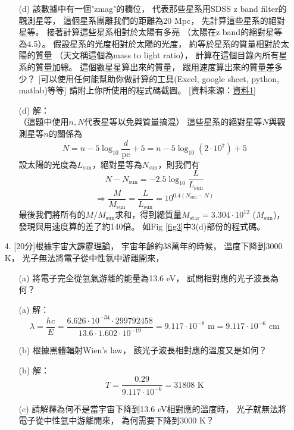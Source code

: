\documentclass{article}
\theoremstyle{definition}
\begin{document}
\begin{enumerate}
\begin{enumerate}
			\item[(d)] 該數據中有一個"zmag"的欄位，
				代表那些星系用SDSS z band filter的觀測星等，
				這個星系團離我們的距離為20 Mpc，
				先計算這些星系的絕對星等。
				接著計算這些星系相對於太陽有多亮
				（太陽在z band的絕對星等為4.5）。
				假設星系的光度相對於太陽的光度，
				約等於星系的質量相對於太陽的質量
				（天文稱這個為mass to light ratio），
				計算在這個目錄內所有星系的質量加總。
				這個數星星算出來的質量，
				跟用速度算出來的質量差多少？
				[可以使用任何能幫助你做計算的工具(Excel, google sheet, python, matlab)等等]
				請附上你所使用的程式碼截圖。
				[資料來源：\href{https://ui.adsabs.harvard.edu/abs/2015yCat..22150022K/abstract}{資料1}]

			\item[(d)] 解：\\
				（這題中使用$n, N$代表星等以免與質量搞混）
				這些星系的絕對星等$N$與觀測星等$n$的關係為
				\[
					N = n - 5 \log_{10} \frac{d}{\text{pc}} + 5 = n - 5 \log_{10} (2 \cdot 10^7) + 5
				\]
				設太陽的光度為$L_{\text{sun}}$，絕對星等為$N_{\text{sun}}$，則我們有
				\[
					N - N_{\text{sun}} = -2.5 \log_{10} \frac{L}{L_{\text{sun}}}
				\]
				\[
					\Rightarrow \frac{M}{M_{\text{sun}}} = \frac{L}{L_{\text{sun}}} = 10^{0.4 (N_{\text{sun}} - N)}
				\]
				最後我們將所有的$M/M_{\text{sun}}$求和，得到總質量$M_{\text{star}} = 3.304 \cdot 10^{12}$ ($M_{\text{sun}}$)，
				發現與用速度算的差了約140倍。
				如Fig \ref{fig3}中3(d)部份的程式碼。
		\end{enumerate}

	\item[4.] [20分]根據宇宙大霹靂理論，
		宇宙年齡約38萬年的時候，
		溫度下降到3000 K，
		光子無法將電子從中性氫中游離開來，
		
		\begin{enumerate}
			\item[(a)] 將電子完全從氫氣游離的能量為13.6 eV，
				試問相對應的光子波長為何？

			\item[(a)] 解：
				\[
					\lambda = \frac{h c}{E} = \frac{6.626 \cdot 10^{-34} \cdot 299792458}{13.6 \cdot 1.602 \cdot 10^{-19}} = 9.117 \cdot 10^{-8} \text{ m} = 9.117 \cdot 10^{-6} \text{ cm} 
				\]

			\item[(b)] 根據黑體輻射Wien's law，
				該光子波長相對應的溫度又是如何？

			\item[(b)] 解：\\
				\[
					T = \frac{0.29}{9.117 \cdot 10^{-6}} = 31808 \text{ K} 
				\]
			\item[(c)] 請解釋為何不是當宇宙下降到13.6 eV相對應的溫度時，
				光子就無法將電子從中性氫中游離開來，
				為何需要下降到3000 K？


\end{enumerate}
\end{enumerate}
\end{document}

